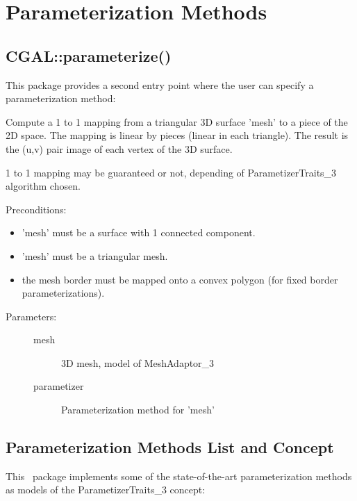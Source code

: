 \section{Parameterization Methods}


\subsection{CGAL::parameterize()}

This package provides a second  entry point
where the user can specify a parameterization method:

{
Compute a 1 to 1 mapping from a triangular 3D surface 'mesh' to a piece of the 2D space. The mapping is linear by pieces (linear in each triangle). The result is the (u,v) pair image of each vertex of the 3D surface.

1 to 1 mapping may be guaranteed or not, depending of ParametizerTraits\_3 algorithm chosen.

Preconditions:\begin{itemize}
\item 'mesh' must be a surface with 1 connected component.\item 'mesh' must be a triangular mesh.\item the mesh border must be mapped onto a convex polygon (for fixed border parameterizations).\end{itemize}
}
\begin{description}
\item[Parameters: ]
\begin{description}
\item[mesh]3D mesh, model of MeshAdaptor\_3 \item[parametizer]Parameterization method for 'mesh' \end{description}
\end{description}


\subsection{Parameterization Methods List and Concept}

This \cgal\ package implements some of the state-of-the-art
parameterization methods as models of the ParametizerTraits\_3 concept:

